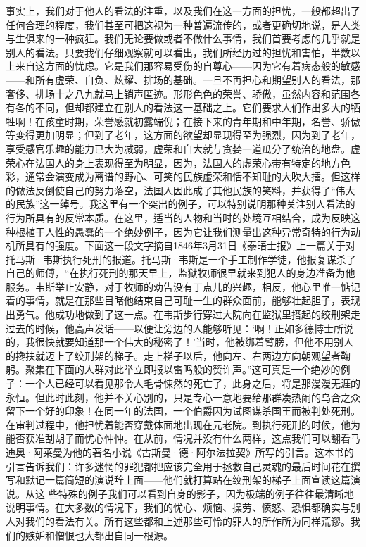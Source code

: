 \documentclass[12pt,oneside]{book}
\begin{document}
事实上，我们对于他人的看法的注重，以及我们在这一方面的担忧，一般都超出了任何合理的程度，我们甚至可把这视为一种普遍流传的，或者更确切地说，是人类与生俱来的一种疯狂。我们无论要做或者不做什么事情，我们首要考虑的几乎就是别人的看法。只要我们仔细观察就可以看出，我们所经历过的担忧和害怕，半数以上来自这方面的忧虑。它是我们那容易受伤的自尊心——因为它有着病态般的敏感——和所有虚荣、自负、炫耀、排场的基础。一旦不再担心和期望别人的看法，那奢侈、排场十之八九就马上销声匿迹。形形色色的荣誉、骄傲，虽然内容和范围各有各的不同，但却都建立在别人的看法这一基础之上。它们要求人们作出多大的牺牲啊！在孩童时期，荣誉感就初露端倪；在接下来的青年期和中年期，名誉、骄傲等变得更加明显；但到了老年，这方面的欲望却显现得至为强烈，因为到了老年，享受感官乐趣的能力已大为减弱，虚荣和自大就与贪婪一道瓜分了统治的地盘。虚荣心在法国人的身上表现得至为明显，因为，法国人的虚荣心带有特定的地方色彩，通常会演变成为离谱的野心、可笑的民族虚荣和恬不知耻的大吹大擂。但这样的做法反倒使自己的努力落空，法国人因此成了其他民族的笑料，并获得了“伟大的民族”这一绰号。我这里有一个突出的例子，可以特别说明那种关注别人看法的行为所具有的反常本质。在这里，适当的人物和当时的处境互相结合，成为反映这种根植于人性的愚蠢的一个绝妙例子，因为它让我们测量出这种异常奇特的行为动机所具有的强度。下面这一段文字摘自1846年3月31日《泰晤士报》上一篇关于对托马斯·韦斯执行死刑的报道。托马斯·韦斯是一个手工制作学徒，他报复谋杀了自己的师傅，“在执行死刑的那天早上，监狱牧师很早就来到犯人的身边准备为他服务。韦斯举止安静，对于牧师的劝告没有丁点儿的兴趣，相反，他心里唯一惦记着的事情，就是在那些目睹他结束自己可耻一生的群众面前，能够壮起胆子，表现出勇气。他成功地做到了这一点。在韦斯步行穿过大院向在监狱里搭起的绞刑架走过去的时候，他高声发话——以便让旁边的人能够听见：‘啊！正如多德博士所说的，我很快就要知道那一个伟大的秘密了！’当时，他被绑着臂膀，但他不用别人的搀扶就迈上了绞刑架的梯子。走上梯子以后，他向左、右两边方向朝观望者鞠躬。聚集在下面的人群对此举立即报以雷鸣般的赞许声。”这可真是一个绝妙的例子：一个人已经可以看见那令人毛骨悚然的死亡了，此身之后，将是那漫漫无涯的永恒。但此时此刻，他并不关心别的，只是专心一意地要给那群凑热闹的乌合之众留下一个好的印象！在同一年的法国，一个伯爵因为试图谋杀国王而被判处死刑。在审判过程中，他担忧着能否穿戴体面地出现在元老院。到执行死刑的时候，他为能否获准刮胡子而忧心忡忡。在从前，情况并没有什么两样，这点我们可以翻看马迪奥·阿莱曼为他的著名小说《古斯曼·德·阿尔法拉契》所写的引言。这本书的引言告诉我们：许多迷惘的罪犯都把应该完全用于拯救自己灵魂的最后时间花在撰写和默记一篇简短的演说辞上面——他们就打算站在绞刑架的梯子上面宣读这篇演说。从这
些特殊的例子我们可以看到自身的影子，因为极端的例子往往最清晰地说明事情。在大多数的情况下，我们的忧心、烦恼、操劳、愤怒、恐惧都确实与别人对我们的看法有关。所有这些都和上述那些可怜的罪人的所作所为同样荒谬。我们的嫉妒和憎恨也大都出自同一根源。 
\end{document}
